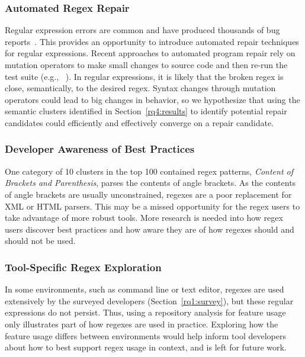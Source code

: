 \vspace{-2pt}
\subsubsection{Automated Regex Repair}
Regular expression errors are common and have produced thousands of bug reports~\cite{Spishak:2012:TSR:2318202.2318207}. This provides an opportunity to introduce automated repair techniques for regular expressions.
Recent approaches to automated program repair rely on mutation operators to make small changes to source code and then re-run the test suite (e.g., ~\cite{cacm10, genprog-tse-journal}). In regular expressions, it is likely that the broken regex is close, semantically, to the desired regex. Syntax changes through mutation operators could lead to big changes in behavior, so we hypothesize that using the semantic clusters identified in Section~\ref{rq4:results} to identify potential repair candidates could efficiently and effectively converge on a repair candidate.

\subsubsection{Developer Awareness of Best Practices}
One category of 10 clusters in the top 100 contained regex patterns, \emph{Content of Brackets and Parenthesis}, parses the contents of angle brackets.  As the contents of angle brackets are usually unconstrained, regexes are a poor replacement for XML or HTML parsers.  This may be a missed opportunity for the regex users to take advantage of more robust tools. More research is needed into how regex users discover best practices and how aware they are of how regexes should and should not be used.






\subsubsection{Tool-Specific Regex Exploration}
In some environments, such as command line or text editor, regexes are used extensively by the surveyed developers (Section~\ref{rq1:survey}), but these regular expressions do not persist. Thus, using a repository analysis for feature usage only illustrates part of how regexes are used in practice. Exploring how the feature usage differs between environments would help inform tool developers about how to best support regex usage in context, and is left for future work.


